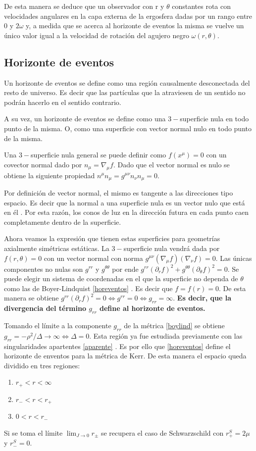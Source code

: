 \documentclass[12pt]{article}
\theoremstyle{plain}
\begin{document}
De esta manera se deduce que un observador con r y $\theta$ constantes rota con velocidades angulares en la capa externa de la ergosfera dadas por un rango entre 0 y $2\omega$ y, a medida que se acerca al horizonte de eventos la misma se vuelve un único valor igual a la velocidad de rotación del agujero negro $\omega (r,\theta )$.
\subsection{Horizonte de eventos}
Un horizonte de eventos se define como  una región causalmente desconectada del resto de universo. Es decir que las partículas que la atraviesen de un sentido no podrán hacerlo en el sentido contrario.

A su vez, un horizonte de eventos se define como una $3-$superficie nula en todo punto de la misma. O, como una superficie con vector normal nulo en todo punto de la misma.

Una $3-$superficie nula general se puede definir como $f(x^{\mu}) = 0$ con un covector normal dado por $n_{\mu}=\nabla _{\mu}f$. Dado que el vector normal es nulo se obtiene la siguiente propiedad $n^{\mu}n_{\mu}=g^{\mu \nu}n_{\nu}n_{\mu}=0$. 

Por definición de vector normal, el mismo es tangente a las direcciones tipo espacio. Es decir que la normal a una superficie nula es un vector nulo que está en él \cite{hartle} . Por esta razón, los conos de luz en la dirección futura en cada punto caen completamente dentro de la superficie.

Ahora veamos la expresión que tienen estas superficies para geometrías axialmente simétricas estáticas. La $3-$superficie nula vendrá dada por $f(r,\theta)=0$ con un vector normal con norma $g^{\mu \nu}(\nabla _{\mu}f)(\nabla _{\nu}f)=0$. Las únicas componentes no nulas son $g^{rr}$ y $g^{\theta\theta}$ por ende $g^{rr}(\partial _rf)^2+g^{\theta\theta}(\partial _{\theta}f)^2=0$. Se puede elegir un sistema de coordenadas en el que la superficie no dependa de $\theta$ como las de Boyer-Lindquist \ref{horeventos} . Es decir que $f=f(r)=0$. De esta manera se obtiene $g^{rr}(\partial _rf)^2=0 \Leftrightarrow g^{rr}=0 \Leftrightarrow g_{rr}=\infty$. \textbf{Es decir, que la divergencia del término $g_{rr}$ define al horizonte de eventos.}

Tomando el límite a la componente $g_{rr}$ de la métrica \ref{boylind} se obtiene $g_{rr}=-\rho ^2/\Delta \rightarrow \infty \Leftrightarrow \Delta = 0.$ Esta región ya fue estudiada previamente con las singularidades apartentes \ref{aparente} . Es por ello que \ref{horeventos} define el horizonte de enventos para la métrica de Kerr. De esta manera el espacio queda dividido en tres regiones:
\begin{enumerate}
\renewcommand{\labelenumi}{(\roman{enumi})} 
\item $r_+ < r < \infty$
\item $r_-<r<r_+$
\item $0<r<r_-$
\end{enumerate}
Si se toma el límite $\lim_{J\to 0} r_{\pm}$ se recupera el caso de Schwarzschild con $r_+^S=2\mu$ y $r_-^S=0$. 
\end{document}
